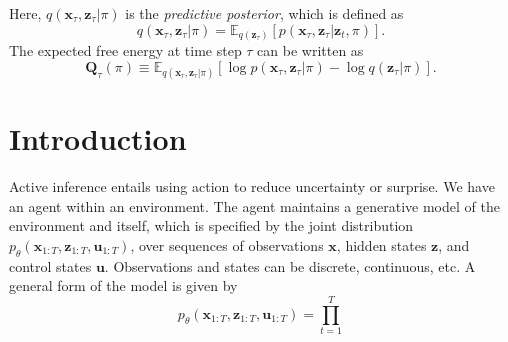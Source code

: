 Here, $q (\mathbf{x}_\tau , \mathbf{z}_\tau | \pi)$ is the \textit{predictive posterior}, which is defined as
\begin{equation}
    q (\mathbf{x}_\tau , \mathbf{z}_\tau | \pi) = \mathbb{E}_{q(\mathbf{z}_\tau) } \left[ p (\mathbf{x}_\tau , \mathbf{z}_\tau | \mathbf{z}_t , \pi) \right].
\end{equation}
The expected free energy at time step $\tau$ can be written as
\begin{equation}
    \mathbf{Q}_\tau (\pi) \equiv \mathbb{E}_{q (\mathbf{x}_\tau , \mathbf{z}_\tau | \pi)} \left[ \log p(\mathbf{x}_\tau , \mathbf{z}_\tau | \pi) - \log q (\mathbf{z}_\tau | \pi) \right].
\end{equation}


\section{Introduction}

Active inference \cite{friston2009reinforcement} entails using action to reduce uncertainty or surprise. We have an agent within an environment. The agent maintains a generative model of the environment and itself, which is specified by the joint distribution $p_\theta (\mathbf{x}_{1:T}, \mathbf{z}_{1:T}, \mathbf{u}_{1:T})$, over sequences of observations $\mathbf{x}$, hidden states $\mathbf{z}$, and control states $\mathbf{u}$. Observations and states can be discrete, continuous, etc. A general form of the model is given by
\begin{equation}
    p_\theta (\mathbf{x}_{1:T}, \mathbf{z}_{1:T}, \mathbf{u}_{1:T}) = \prod_{t=1}^T 
\end{equation}


